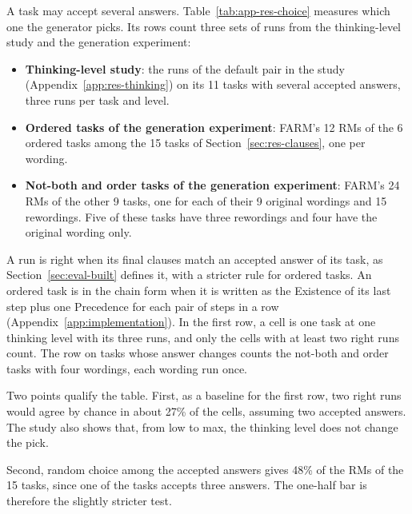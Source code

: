 \documentclass[11pt,english,listoffigures,listoftables]{tfgetsinf}
\begin{document}
A task may accept several answers. Table~\ref{tab:app-res-choice} measures which one the generator picks. Its rows count three sets of runs from the thinking-level study and the generation experiment:
\begin{itemize}
    \item \textbf{Thinking-level study}: the runs of the default pair in the study (Appendix~\ref{app:res-thinking}) on its 11 tasks with several accepted answers, three runs per task and level.
    \item \textbf{Ordered tasks of the generation experiment}: FARM's 12 RMs of the 6 ordered tasks among the 15 tasks of Section~\ref{sec:res-clauses}, one per wording.
    \item \textbf{Not-both and order tasks of the generation experiment}: FARM's 24 RMs of the other 9 tasks, one for each of their 9 original wordings and 15 rewordings. Five of these tasks have three rewordings and four have the original wording only.
\end{itemize}

A run is right when its final clauses match an accepted answer of its task, as Section~\ref{sec:eval-built} defines it, with a stricter rule for ordered tasks. An ordered task is in the chain form when it is written as the Existence of its last step plus one Precedence for each pair of steps in a row (Appendix~\ref{app:implementation}). In the first row, a cell is one task at one thinking level with its three runs, and only the cells with at least two right runs count. The row on tasks whose answer changes counts the not-both and order tasks with four wordings, each wording run once.

Two points qualify the table. First, as a baseline for the first row, two right runs would agree by chance in about 27\% of the cells, assuming two accepted answers. The study also shows that, from low to max, the thinking level does not change the pick.

Second, random choice among the accepted answers gives 48\% of the RMs of the 15 tasks, since one of the tasks accepts three answers. The one-half bar is therefore the slightly stricter test.
\end{document}
